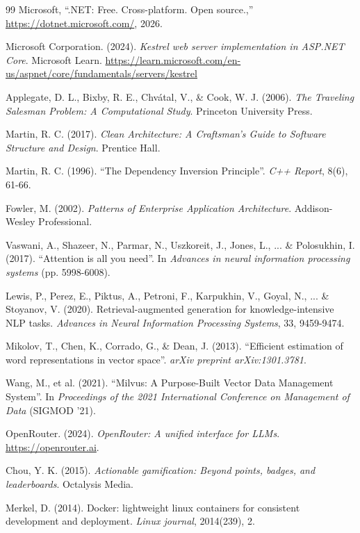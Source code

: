 \begin{thebibliography}{99}
Microsoft, ``.NET: Free. Cross-platform. Open source.,'' \url{https://dotnet.microsoft.com/}, 2026.

Microsoft Corporation. (2024). \textit{Kestrel web server implementation in ASP.NET Core}. Microsoft Learn. \url{https://learn.microsoft.com/en-us/aspnet/core/fundamentals/servers/kestrel}

Applegate, D. L., Bixby, R. E., Chvátal, V., \& Cook, W. J. (2006). \textit{The Traveling Salesman Problem: A Computational Study}. Princeton University Press.

Martin, R. C. (2017). \textit{Clean Architecture: A Craftsman's Guide to Software Structure and Design}. Prentice Hall.

Martin, R. C. (1996). ``The Dependency Inversion Principle''. \textit{C++ Report}, 8(6), 61-66.

Fowler, M. (2002). \textit{Patterns of Enterprise Application Architecture}. Addison-Wesley Professional.

Vaswani, A., Shazeer, N., Parmar, N., Uszkoreit, J., Jones, L., ... \& Polosukhin, I. (2017). ``Attention is all you need''. In \textit{Advances in neural information processing systems} (pp. 5998-6008).

Lewis, P., Perez, E., Piktus, A., Petroni, F., Karpukhin, V., Goyal, N., ... \& Stoyanov, V. (2020). Retrieval-augmented generation for knowledge-intensive NLP tasks. \textit{Advances in Neural Information Processing Systems}, 33, 9459-9474.

Mikolov, T., Chen, K., Corrado, G., \& Dean, J. (2013). ``Efficient estimation of word representations in vector space''. \textit{arXiv preprint arXiv:1301.3781}.

Wang, M., et al. (2021). ``Milvus: A Purpose-Built Vector Data Management System''. In \textit{Proceedings of the 2021 International Conference on Management of Data} (SIGMOD '21).

OpenRouter. (2024). \textit{OpenRouter: A unified interface for LLMs}. \url{https://openrouter.ai}.

Chou, Y. K. (2015). \textit{Actionable gamification: Beyond points, badges, and leaderboards}. Octalysis Media.

Merkel, D. (2014). Docker: lightweight linux containers for consistent development and deployment. \textit{Linux journal}, 2014(239), 2.


\end{thebibliography}
